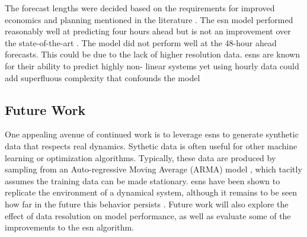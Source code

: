 The forecast lengths were decided based on the requirements for improved
economics and planning mentioned in the literature
 \cite{wang_quantifying_2016,mc_garrigle_quantifying_2015,brancucci_martinez-anido_value_2016}. The \gls{esn} model performed reasonably well at predicting
 four hours ahead but is not an improvement over the state-of-the-art
 \cite{wang_quantifying_2016,powers_weather_2017}. The model did not perform
 well at the 48-hour ahead forecasts. This could be due to the lack of higher
 resolution data. \glspl{esn} are known for their ability to predict highly non-
 linear systems \cite{jaeger_harnessing_2004,lukosevicius_reservoir_2009} yet
 using hourly data could add superfluous complexity that confounds the model
 \cite{garland_model-free_2014}

\subsection{Future Work}
One appealing avenue of continued work is to leverage \glspl{esn} to generate
synthetic data that respects real dynamics. Sythetic data is often useful for
other machine learning or optimization algorithms. Typically, these data are
produced by sampling from an Auto-regressive Moving Average (ARMA) model \cite{baker_optimal_2018, garcia_dynamic_2016}, which tacitly assumes the
training data can be made stationary. \glspl{esn} have been shown to replicate
the environment of a dynamical system, although it remains to be seen how far
in the future this behavior persists \cite{pathak_using_2017,pathak_model-free_2018}.
Future work will also explore the effect of data resolution on model
performance, as well as evaluate some of the improvements to the \gls{esn}
algorithm.
